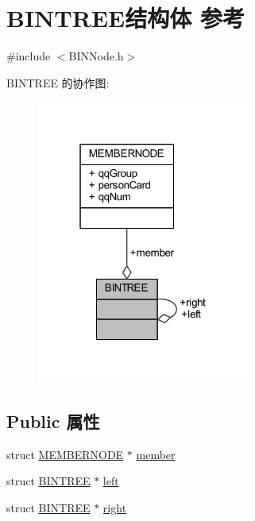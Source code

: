 \hypertarget{struct_b_i_n_t_r_e_e}{}\section{B\+I\+N\+T\+R\+E\+E结构体 参考}
\label{struct_b_i_n_t_r_e_e}


{\ttfamily \#include $<$B\+I\+N\+Node.\+h$>$}



B\+I\+N\+T\+R\+EE 的协作图\+:
\nopagebreak
\begin{figure}[H]
\begin{center}
\leavevmode
\includegraphics[width=199pt]{struct_b_i_n_t_r_e_e__coll__graph}
\end{center}
\end{figure}
\subsection*{Public 属性}
\begin{DoxyCompactItemize}
\item 
struct \hyperlink{struct_m_e_m_b_e_r_n_o_d_e}{M\+E\+M\+B\+E\+R\+N\+O\+DE} $\ast$ \hyperlink{struct_b_i_n_t_r_e_e_a3ab2c8b4cbbacb80e686e334208c5d48}{member}
\item 
struct \hyperlink{struct_b_i_n_t_r_e_e}{B\+I\+N\+T\+R\+EE} $\ast$ \hyperlink{struct_b_i_n_t_r_e_e_a4186a51481617735e0ad0ddc859a7ebf}{left}
\item 
struct \hyperlink{struct_b_i_n_t_r_e_e}{B\+I\+N\+T\+R\+EE} $\ast$ \hyperlink{struct_b_i_n_t_r_e_e_abe35ee9da1117f8df6d969647ad5ee19}{right}
\end{DoxyCompactItemize}


